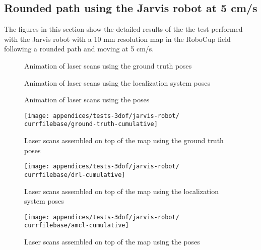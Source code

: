 \subsection{Rounded path using the Jarvis robot at 5 cm/s}\label{subsec:appendix-a_jarvis-robot-tests_rounded-path-using-the-jarvis-robot-at-5-cm-s}

The figures in this section show the detailed results of the the test performed with the Jarvis robot with a 10 mm resolution map in the RoboCup field following a rounded path and moving at 5 cm/s.


\begin{figure}[H]
	\centering
	\caption{Animation of laser scans using the ground truth poses}
\end{figure}

\begin{figure}[H]
	\centering
	\caption{Animation of laser scans using the localization system poses}
\end{figure}

\begin{figure}[H]
	\centering
	\caption{Animation of laser scans using the  poses}
\end{figure}


\begin{figure}[H]
	\centering
	\texttt{[image: appendices/tests-3dof/jarvis-robot/\\currfilebase/ground-truth-cumulative]}
	\caption{Laser scans assembled on top of the map using the ground truth poses}
\end{figure}

\begin{figure}[H]
	\centering
	\texttt{[image: appendices/tests-3dof/jarvis-robot/\\currfilebase/drl-cumulative]}
	\caption{Laser scans assembled on top of the map using the localization system poses}
\end{figure}

\begin{figure}[H]
	\centering
	\texttt{[image: appendices/tests-3dof/jarvis-robot/\\currfilebase/amcl-cumulative]}
	\caption{Laser scans assembled on top of the map using the  poses}
\end{figure}


